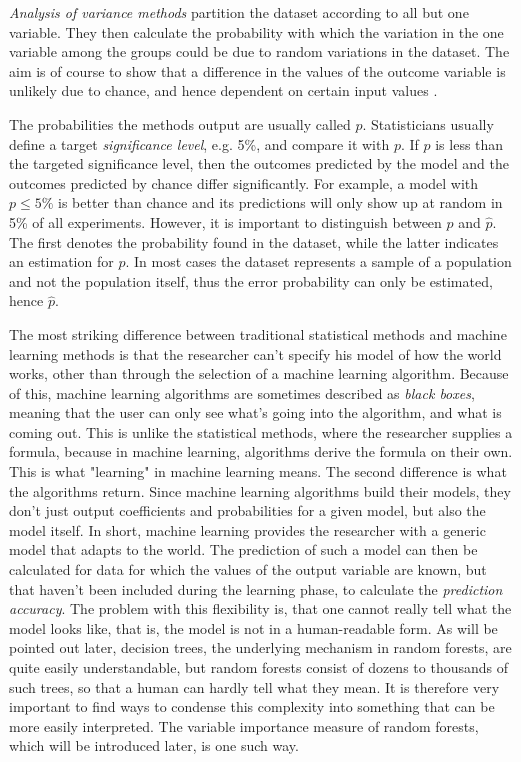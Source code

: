 \documentclass[a4paper,man,12pt,apacite,floatsintext,draftfirst]{apa6} %
\begin{document}
\emph{Analysis of variance methods} partition the dataset
according to all but one variable. They then calculate the probability with
which the variation in the one variable among the groups could be due to
random variations in the dataset.
The aim is of course to show that a difference in the values of the outcome
variable is unlikely due to chance, and hence dependent on certain
input values \cite{wpAOV}.

The probabilities the methods output are usually called \(p\).
Statisticians usually define a target \emph{significance level},
e.g. 5\%, and compare it with \(p\).
If \(p\) is less than the targeted significance level, then
the outcomes predicted by the model and the outcomes predicted by chance
differ significantly.
For example, a model with \(p \le 5\%\) is better than chance and its
predictions will only show up at random in 5\% of all experiments.
However, it is important to distinguish between \(p\) and \(\hat{p}\).
The first denotes the probability found in the dataset, while the latter
indicates an estimation for \(p\).
In most cases the dataset represents a sample of a population and not the
population itself, thus the error probability can only be estimated,
hence \(\hat{p}\).

The most striking difference between traditional statistical methods and
machine learning methods is that the researcher can't specify his model of
how the world works, other than through the selection of a machine learning
algorithm.
Because of this, machine learning algorithms are sometimes described as
\emph{black boxes}, meaning that the user can only see what's going into the
algorithm, and what is coming out.
This is unlike the statistical methods, where the researcher supplies a
formula, because in machine learning, algorithms derive the formula on their own.
This is what "learning" in machine learning means.
The second difference is what the algorithms return.
Since machine learning algorithms build their models,
they don't just output coefficients and probabilities for a given model,
but also the model itself.
In short, machine learning provides the researcher with a generic model
that adapts to the world.
The prediction of such a model can then be calculated for data for which
the values of the output variable are known, but that haven't
been included during the learning phase,
to calculate the \emph{prediction accuracy}.
The problem with this flexibility is, that one cannot really tell what the
model looks like, that is, the model is not in a human-readable form.
As will be pointed out later, decision trees, the underlying mechanism in
random forests, are quite easily understandable, but random forests
consist of dozens to thousands of such trees, so that a human can hardly
tell what they mean.
It is therefore very important to find ways to condense this complexity
into something that can be more easily interpreted.
The variable importance measure of random forests, which will be introduced
later, is one such way.
\end{document}
